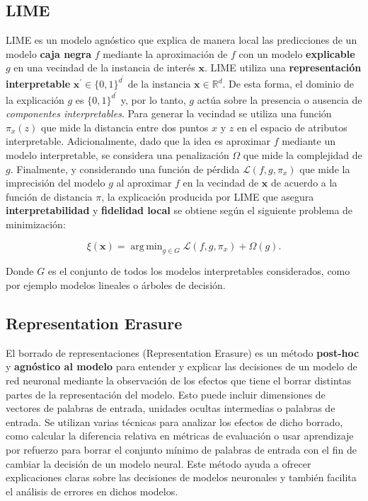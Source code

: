\documentclass[conference]{IEEEtran}
\DeclareMathOperator*{\argmin}{arg\,min}
\begin{document}
\subsection{LIME}
LIME \cite{ribeiro2016why} es un modelo agnóstico que explica de manera local las predicciones de un modelo \textbf{caja negra} $f$ mediante la aproximación de $f$ con un modelo \textbf{explicable} $g$ en una vecindad de la instancia de interés $\bm{x}$. LIME utiliza una \textbf{representación interpretable} $\bm{x^\prime} \in \{0,1\}^{d^\prime}$ de la instancia $\bm{x} \in \mathbb{R}^d$. De esta forma, el dominio de la explicación $g$ es $\{0,1\}^{d^\prime}$ y, por lo tanto, $g$ actúa sobre la presencia o ausencia de \textit{componentes interpretables}. Para generar la vecindad se utiliza una función $\pi_x(z)$ que mide la distancia entre dos puntos $x$ y $z$ en el espacio de atributos interpretable. Adicionalmente, dado que la idea es aproximar $f$ mediante un modelo interpretable, se considera una penalización $\Omega$ que mide la complejidad de $g$. Finalmente, y considerando una función de pérdida $\mathcal{L}(f, g, \pi_x)$ que mide la imprecisión del modelo $g$ al aproximar $f$ en la vecindad de $\bm{x}$ de acuerdo a la función de distancia $\pi$, la explicación producida por LIME que asegura \textbf{interpretabilidad} y \textbf{fidelidad local} se obtiene según el siguiente problema de minimización:

\begin{equation}
    \xi(\bm{x}) = \argmin_{g \in G} \mathcal{L}(f, g, \pi_x) + \Omega(g).
\end{equation}

Donde $G$ es el conjunto de todos los modelos interpretables considerados, como por ejemplo modelos lineales o árboles de decisión.

\subsection{Representation Erasure}
El borrado de representaciones \cite{li2017understanding} (Representation Erasure) es un método \textbf{post-hoc} y \textbf{agnóstico al modelo} para entender y explicar las decisiones de un modelo de red neuronal mediante la observación de los efectos que tiene el borrar distintas partes de la representación del modelo. Esto puede incluir dimensiones de vectores de palabras de entrada, unidades ocultas intermedias o palabras de entrada. Se utilizan varias técnicas para analizar los efectos de dicho borrado, como calcular la diferencia relativa en métricas de evaluación o usar aprendizaje por refuerzo para borrar el conjunto mínimo de palabras de entrada con el fin de cambiar la decisión de un modelo neural. Este método ayuda a ofrecer explicaciones claras sobre las decisiones de modelos neuronales y también facilita el análisis de errores en dichos modelos.
\end{document}
